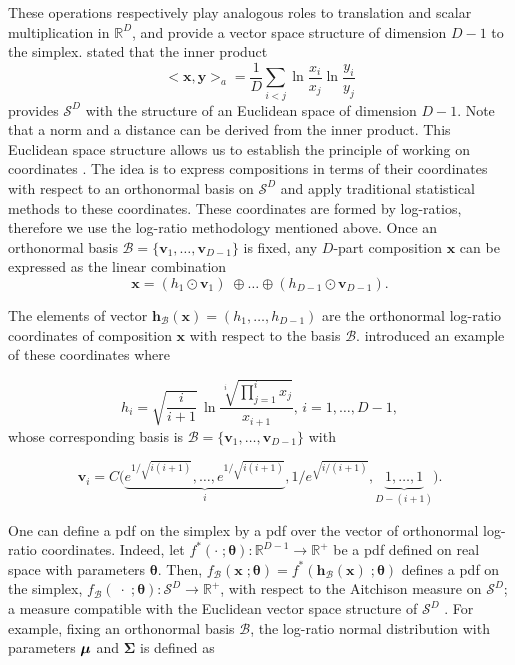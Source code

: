 \documentclass[12pt, a4paper]{article}
\newcommand{\m}[1]{\boldsymbol{#1}}
\begin{document}
These operations respectively play analogous roles to translation and scalar multiplication in $\mathbb{R}^D$, and provide a vector space
structure of dimension $D-1$ to the simplex. \cite{pawlowsky2001geometric} stated that the inner product 
\begin{equation}
<\textbf{x}, \textbf{y}>_a = \frac{1}{D} \sum_{i < j} \ln \frac{x_i}{x_j} \ln \frac{y_i}{y_j}
\label{inner_prod}
\end{equation}
 provides $\mathcal{S}^D$ with the structure of an Euclidean space of dimension $D-1$. Note that a norm and a distance can be derived from the inner product.
This Euclidean space structure allows us to establish the principle of working on coordinates \citep{figueras2011principle}. The idea is to express compositions in terms of their coordinates with respect to an orthonormal basis on $\mathcal{S}^D$ and apply
traditional statistical methods to these coordinates. These coordinates are formed by log-ratios, therefore we use the log-ratio methodology mentioned above. Once an orthonormal basis $\mathcal{B} = \{\textbf{v}_1, \dots, \textbf{v}_{D-1}\}$ is fixed, any $D$-part composition $\textbf{x}$ can be expressed as the linear combination
\[
\textbf{x} = (h_1 \odot \textbf{v}_1)\; \oplus \dots  \oplus (h_{D-1} \odot \textbf{v}_{D-1}).
\]

The elements of vector $\textbf{h}_\mathcal{B}(\textbf{x})=(h_1, \dots, h_{D-1})$ are the orthonormal log-ratio coordinates of composition $\textbf{x}$ with respect to the basis $\mathcal{B}$. \cite{egozcue2003isometric} introduced an example of these coordinates where

\begin{equation}
\label{eilr}
h_i=\sqrt{\frac{i}{i+1}}\,\ln\frac{\sqrt[i]
{\prod_{j=1}^{i} x_j}}{x_{i+1}},\,i=1,\dots,D-1,
\end{equation}
whose corresponding basis is $\mathcal{B} = \{\textbf{v}_1, \dots, \textbf{v}_{D-1}\}$ with

\[
\textbf{v}_i = C\Big( \underbrace{e^{1/\sqrt{i(i+1)}}, \dots, e^{1/\sqrt{i(i+1)}}}_{i}, 1/e^{\sqrt{ i/(i+1)}}, \underbrace{1, \dots, 1}_{D-(i+1)} \Big).
\]


One can define a pdf on the simplex by a pdf over the vector of orthonormal log-ratio coordinates. Indeed, let $f^*(\cdot \;; \m\theta) : \mathbb{R}^{D-1} \rightarrow \mathbb{R}^+$ be a pdf defined on real space with parameters $\m\theta$. Then, $f_\mathcal{B}(\mathbf{x}\;; \m\theta) = f^*(\mathbf{h}_\mathcal{B}(\textbf{x})\;; \m\theta)$ defines a pdf on the simplex, $f_\mathcal{B}(\;\cdot\;; \m\theta): \mathcal{S}^D \rightarrow \mathbb{R}^+$, with respect to the Aitchison measure on $\mathcal{S}^D$; a measure compatible with the Euclidean vector space structure of $\mathcal{S}^D$ \citep{mateu2013normal}. For example, fixing an orthonormal basis $\mathcal{B}$, the log-ratio normal distribution with parameters $\mbox{\boldmath \(\mu\)}$ and $\mathbf{\Sigma}$ is defined as
\end{document}
